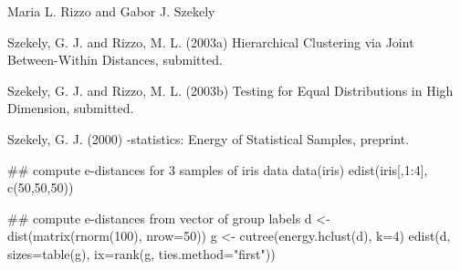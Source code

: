 \begin{Author}\relax
Maria L. Rizzo  and
Gabor J. Szekely 
\end{Author}
\begin{References}\relax
Szekely, G. J. and Rizzo, M. L. (2003a) Hierarchical Clustering
via Joint Between-Within Distances, submitted.

Szekely, G. J. and Rizzo, M. L. (2003b) Testing for Equal
Distributions in High Dimension, submitted.

Szekely, G. J. (2000) -statistics: Energy of 
Statistical Samples, preprint.\end{References}
\begin{SeeAlso}\relax
{}
 
\end{SeeAlso}
\begin{Examples}
\begin{ExampleCode}
 ## compute e-distances for 3 samples of iris data
 data(iris)
 edist(iris[,1:4], c(50,50,50))


 ## compute e-distances from vector of group labels
 d <- dist(matrix(rnorm(100), nrow=50))
 g <- cutree(energy.hclust(d), k=4)
 edist(d, sizes=table(g), ix=rank(g, ties.method="first"))
 \end{ExampleCode}
\end{Examples}

